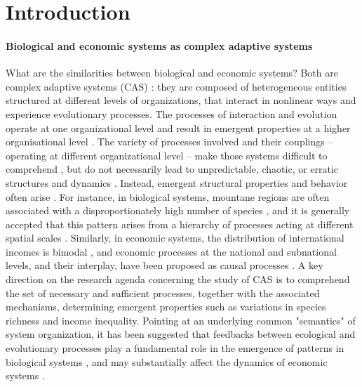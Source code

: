 %
\chapter{Introduction}
\label{sec:intro}


\subsubsection*{Biological and economic systems as complex adaptive systems}
What are the similarities between biological and economic systems? Both are complex adaptive systems (CAS) \cite{Levin2002}: they are composed of heterogeneous entities structured at different levels of organizations, that interact in nonlinear ways and experience evolutionary processes. The processes of interaction and evolution operate at one organizational level and result in emergent properties at a higher organisational level \cite{Levin1998}. The variety of processes involved and their couplings -- operating at different organizational level -- make those systems difficult to comprehend \cite{Strogatz2001a}, but do not necessarily lead to unpredictable, chaotic, or erratic structures and dynamics \cite{Olff2009}. Instead, emergent structural properties and behavior often arise \cite{mitchell2009complexity}.
% 
For instance, in biological systems, mountane regions are often associated with a disproportionately high number of species \cite{Rahbek2019}, and it is generally accepted that this pattern arises from a hierarchy of processes acting at different spatial scales \cite{Rangel2018,Rahbek2019a}.
% 
Similarly, in economic systems, the distribution of international incomes is bimodal \cite{acemoglu2001colonial}, and economic processes at the national and subnational levels, and their interplay, have been proposed as causal processes \cite{Hidalgo2021,C.A.HidalgoB.Klinger}. 
% 
A key direction on the research agenda concerning the study of CAS is to comprehend the set of necessary and sufficient processes, together with the associated mechanisms, determining emergent properties such as variations in species richness and income inequality.
% 
Pointing at an underlying common "semantics" of system organization, it has been suggested that feedbacks between ecological and evolutionary processes play a fundamental role in the emergence of patterns in biological systems \cite{Pelletier2009}, and may substantially affect the dynamics of economic systems \cite{Hodgson2019}.

